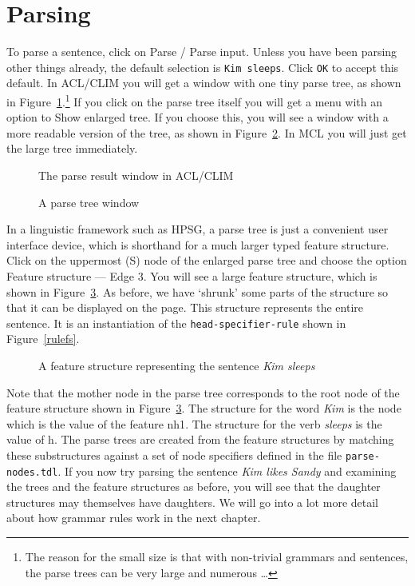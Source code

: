 \documentclass[12pt]{report}
\newcommand{\filename}[1]{{\tt #1}}
\newcommand{\lkbentryname}[1]{{\tt #1}}
\newcommand{\lkbmenucommand}{{\bf}}
\begin{document}
\section{Parsing}

To parse a sentence, click on {\lkbmenucommand Parse} / {\lkbmenucommand Parse input}.  
Unless you have been parsing other things already,
the default selection is {\tt Kim sleeps}.  Click {\tt OK} to
accept this default.  In ACL/CLIM
you will get a window with one tiny parse
tree, as shown in Figure~\ref{kimsleeps}.\footnote{The reason for the
small size is that with non-trivial grammars and sentences, the parse 
trees can be very large and numerous \ldots} If you click on the parse
tree itself you will get a menu with an option to {\lkbmenucommand Show enlarged tree}.
If you choose this, you will see a window with a more readable version
of the tree, as shown in Figure~\ref{ptree}. In MCL you will just get the 
large tree immediately.
\begin{figure}
\epsfxsize=2in
\caption{The parse result window in ACL/CLIM}
\label{kimsleeps}
\end{figure}
\begin{figure}
\epsfxsize=2in
\caption{A parse tree window}
\label{ptree}
\end{figure}

In a linguistic framework such as HPSG, a parse tree is just a convenient
user interface device, which is shorthand for a much larger typed
feature structure.  Click on the uppermost (S) node of the
enlarged parse tree and choose the option 
{\lkbmenucommand Feature structure --- Edge 3}.  
You will
see a large feature structure, which is shown in Figure~\ref{bigfs}.
As before, we have `shrunk' some parts of the structure so that
it can be displayed on the page.
This structure represents the entire
sentence.  It is an instantiation of the \lkbentryname{head-specifier-rule}
shown in Figure~\ref{rulefs}.
\begin{figure}
\epsfxsize=4in
\caption{A feature structure representing the sentence {\it Kim sleeps}}
\label{bigfs}
\end{figure}

Note that the mother node in the parse tree corresponds
to the root node of the feature structure shown in Figure~\ref{bigfs}.
The structure for the word {\it Kim} is the node which
is the value of the feature {\feature nh1}.  The structure for the
verb {\it sleeps} is the value of {\feature h}.
The parse trees are created from the feature structures
by matching these substructures against a set of node specifiers
defined in the file \filename{parse-nodes.tdl}.
If you now try parsing the sentence {\it Kim likes Sandy}
and examining the trees and the feature structures as before, you
will see that the daughter structures may themselves have daughters.
We will go into a lot more detail about how grammar rules work
in the next chapter.
\end{document}
